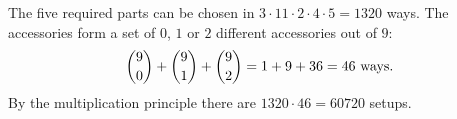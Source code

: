 The five required parts can be chosen in $3\cdot11\cdot2\cdot4\cdot5=1320$ ways. The accessories form a set of $0$, $1$ or $2$ different accessories out of $9$:
\[\dbinom90+\dbinom91+\dbinom92=1+9+36=46\text{ ways}.\]
By the multiplication principle there are $1320\cdot46=\boxed{60720}$ setups.
